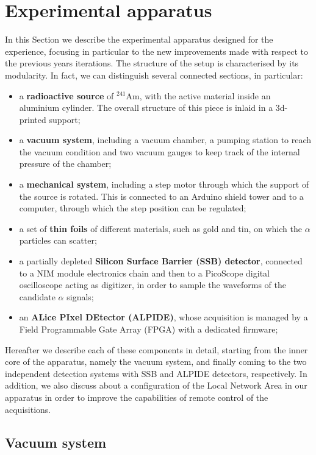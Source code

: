 \documentclass[../../main/main.tex]{subfiles}
\begin{document}
\section{Experimental apparatus}
\label{sec:apparatus}
In this Section we describe the experimental apparatus designed for the experience, focusing in particular to the new improvements made with respect to the previous years iterations. The structure of the setup is characterised by its modularity. In fact, we can distinguish several connected sections, in particular:
\begin{itemize}
    \item a \textbf{radioactive source} of \( {}^{241}\mathrm{Am} \), with the active material inside an aluminium cylinder. The overall structure of this piece is inlaid in a 3d-printed support;
    \item a \textbf{vacuum system}, including a vacuum chamber, a pumping station to reach the vacuum condition and two vacuum gauges to keep track of the internal pressure of the chamber;
    \item a \textbf{mechanical system}, including a step motor through which the support of the source is rotated. This is connected to an Arduino shield tower and to a computer, through which the step position can be regulated;
    \item a set of \textbf{thin foils} of different materials, such as gold and tin, on which the \( \alpha \) particles can scatter;
    \item a partially depleted \textbf{Silicon Surface Barrier (SSB) detector}, connected to a NIM module electronics chain and then to a PicoScope digital oscilloscope acting as digitizer, in order to sample the waveforms of the candidate \( \alpha \) signals;
    \item an \textbf{ALice PIxel DEtector (ALPIDE)}, whose acquisition is managed by a Field Programmable Gate Array (FPGA) with a dedicated firmware;
\end{itemize}
Hereafter we describe each of these components in detail, starting from the inner core of the apparatus, namely the vacuum system, and finally coming to the two independent detection systems with SSB and ALPIDE detectors, respectively. In addition, we also discuss about a configuration of the Local Network Area in our apparatus in order to improve the capabilities of remote control of the acquisitions.



\subsection{Vacuum system}
\end{document}
